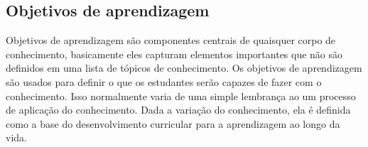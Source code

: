 
\subsection{Objetivos de aprendizagem}

Objetivos de aprendizagem s\~{a}o componentes centrais de quaisquer corpo de conhecimento, basicamente eles capturam elementos importantes que n\~{a}o s\~{a}o definidos em uma lista de t\'{o}picos de conhecimento. Os objetivos de aprendizagem s\~{a}o usados para definir o que os estudantes ser\~{a}o capazes de fazer com o conhecimento. Isso normalmente varia de uma simple lembran\c{c}a ao um processo de aplicação do conhecimento. Dada a varia\c{c}\~{a}o do conhecimento, ela \'{e} definida como a base do desenvolvimento curricular para a aprendizagem ao longo da vida.

